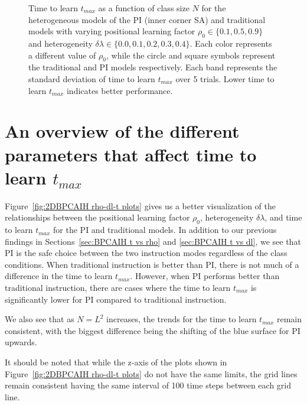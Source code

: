 \begin{figure}[htbp!]
   \caption[Class size $N$ dependence of time to learn $t_{max}$ for the heterogeneous classroom model]{Time to learn $t_{max}$ as a function of class size $N$ for the heterogeneous models of the PI (inner corner SA) and traditional models with varying positional learning factor $\rho_0\in\lbrace 0.1, 0.5, 0.9 \rbrace$ and heterogeneity $\delta\lambda\in\lbrace0.0, 0.1, 0.2, 0.3, 0.4 \rbrace$. 
   Each color represents a different value of $\rho_0$, while the circle and square symbols represent the traditional and PI models respectively.
   Each band represents the standard deviation of time to learn $t_{max}$ over 5 trials.
   Lower time to learn $t_{max}$ indicates better performance.
   }
   \label{fig:2DBPCAIH n-t plots}
\end{figure}

\newpage %

\section{An overview of the different parameters that affect time to learn $t_{max}$}\label{sec:BPCAIH 3D plots}

Figure~\ref{fig:2DBPCAIH rho-dl-t plots} gives us a better visualization of the relationships between the positional learning factor $\rho_0$, heterogeneity $\delta\lambda$, and time to learn $t_{max}$ for the PI and traditional models.
In addition to our previous findings in Sections~\ref{sec:BPCAIH t vs rho} and \ref{sec:BPCAIH t vs dl}, we see that PI is the safe choice between the two instruction modes regardless of the class conditions.
When traditional instruction is better than PI, there is not much of a difference in the time to learn $t_{max}$.
However, when PI performs better than traditional instruction, there are cases where the time to learn $t_{max}$ is significantly lower for PI compared to traditional instruction.

We also see that as $N=L^2$ increases, the trends for the time to learn $t_{max}$ remain consistent, with the biggest difference being  the shifting of the blue surface for PI upwards.

It should be noted that while the z-axis of the plots shown in Figure~\ref{fig:2DBPCAIH rho-dl-t plots} do not have the same limits, the grid lines remain consistent having the same interval of 100 time steps between each grid line.

